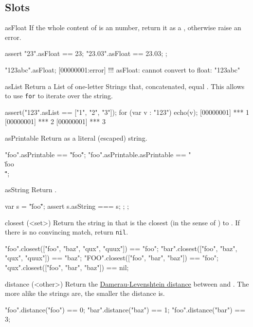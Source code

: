 \subsection{Slots}
\begin{urbiscriptapi}
\item[asFloat] If the whole content of \this is an number, return it as a
  , otherwise raise an error.
\begin{urbiscript}
assert
{
     "23".asFloat == 23;
  "23.03".asFloat == 23.03;
};

"123abc".asFloat;
[00000001:error] !!! asFloat: cannot convert to float: "123abc"
\end{urbiscript}

\item[asList]
  Return a List of one-letter Strings that, concatenated, equal
  \this.  This allows to use \lstinline|for| to iterate
  over the string.
\begin{urbiscript}
assert("123".asList == ["1", "2", "3"]);
for (var v : "123")
  echo(v);
[00000001] *** 1
[00000001] *** 2
[00000001] *** 3
\end{urbiscript}

\item[asPrintable]
  Return \this as a literal (escaped) string.
\begin{urbiassert}
"foo".asPrintable == "\"foo\"";
"foo".asPrintable.asPrintable == "\"\\\"foo\\\"\"";
\end{urbiassert}

\item[asString]
  Return \this.
\begin{urbiscript}
{
  var s = "\"foo\"";
  assert { s.asString === s; };
};
\end{urbiscript}

\item[closest](<set>)%
  Return the string in  that is the closest (in the sense of
  ) to \this.  If there is no convincing match,
  return \lstinline|nil|.
\begin{urbiassert}
"foo".closest(["foo", "baz", "qux", "quux"]) == "foo";
"bar".closest(["foo", "baz", "qux", "quux"]) == "baz";
"FOO".closest(["foo", "bar", "baz"])         == "foo";
"qux".closest(["foo", "bar", "baz"])         == nil;
\end{urbiassert}

\item[distance](<other>)%
  Return the
  \href{http://en.wikipedia.org/wiki/Damerau-Levenshtein_distance}
  {Damerau-Levenshtein distance} between \this and
  .  The more alike the strings are, the smaller the
  distance is.
\begin{urbiassert}
"foo".distance("foo") == 0;
"bar".distance("baz") == 1;
"foo".distance("bar") == 3;


\end{urbiassert}
\end{urbiscriptapi}
